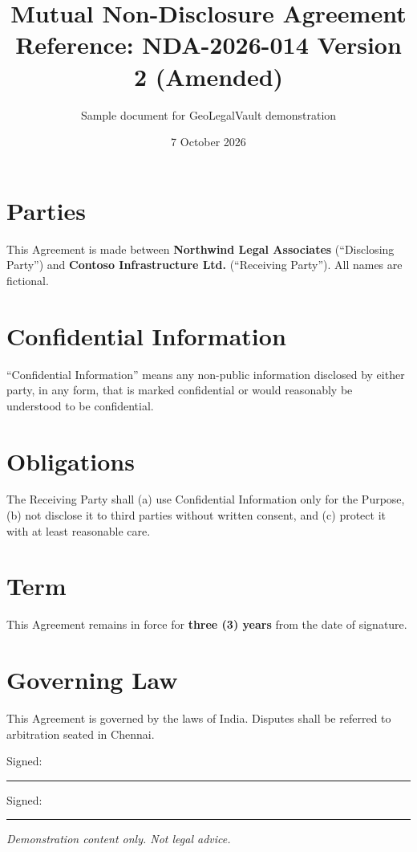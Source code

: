 \documentclass[11pt,a4paper]{article}
\title{\textbf{Mutual Non-Disclosure Agreement}\\[2pt]\large Reference: NDA-2026-014 \quad Version 2 (Amended)}
\author{Sample document for GeoLegalVault demonstration}
\date{7 October 2026}
\begin{document}
\maketitle

\section*{Parties}
This Agreement is made between \textbf{Northwind Legal Associates} (``Disclosing Party'') and
\textbf{Contoso Infrastructure Ltd.} (``Receiving Party''). All names are fictional.

\section{Confidential Information}
``Confidential Information'' means any non-public information disclosed by either party, in any
form, that is marked confidential or would reasonably be understood to be confidential.

\section{Obligations}
The Receiving Party shall (a) use Confidential Information only for the Purpose, (b) not disclose it
to third parties without written consent, and (c) protect it with at least reasonable care.

\section{Term}
This Agreement remains in force for \textbf{three (3) years} from the date of signature.

\section{Governing Law}
This Agreement is governed by the laws of India. Disputes shall be referred to arbitration seated in Chennai.

\vspace{2cm}
\noindent Signed: \rule{5cm}{0.4pt} \hfill Signed: \rule{5cm}{0.4pt}

\medskip
\small\textit{Demonstration content only. Not legal advice.}
\end{document}

